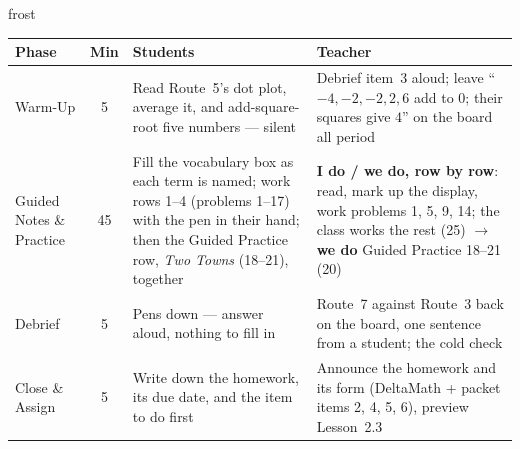 \documentclass[10pt]{article}
\begin{document}
\begin{fixedskillbox}{frost}
\renewcommand{\arraystretch}{1.25}
\begin{tabularx}{\linewidth}{@{}l c X X@{}}
\textbf{Phase} & \textbf{Min} & \textbf{Students} & \textbf{Teacher} \\
\hline
Warm-Up & 5 & Read Route~5's dot plot, average it, and add-square-root five numbers ---
  silent & Debrief item~3 aloud; leave ``$-4, -2, -2, 2, 6$ add to $0$; their squares give
  $4$'' on the board all period \\
Guided Notes \& Practice & 45 & Fill the vocabulary box as each term is named; work rows 1--4
  (problems 1--17) with the pen in their hand; then the Guided Practice row, \emph{Two Towns}
  (18--21), together & \textbf{I do / we do, row by row}: read, mark up the display, work
  problems 1, 5, 9, 14; the class works the rest (25) $\to$ \textbf{we do} Guided Practice
  18--21 (20) \\
Debrief & 5 & Pens down --- answer aloud, nothing to fill in & Route~7 against Route~3 back on
  the board, one sentence from a student; the cold check \\
Close \& Assign & 5 & Write down the homework, its due date, and the item to do first &
  Announce the homework and its form (DeltaMath + packet items 2, 4, 5, 6), preview Lesson~2.3 \\
\end{tabularx}
\end{fixedskillbox}
\end{document}
